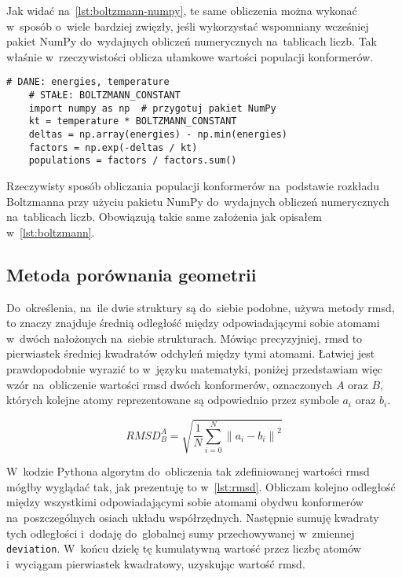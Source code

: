 Jak widać na~\cref{lst:boltzmann-numpy}, te same obliczenia można wykonać w~sposób o~wiele
  bardziej zwięzły, jeśli wykorzystać wspomniany wcześniej pakiet NumPy do~wydajnych obliczeń
  numerycznych na~tablicach liczb.
Tak właśnie \tesliper{} w~rzeczywistości oblicza ułamkowe wartości populacji konformerów.

\begin{listing}
  \begin{lstlisting}[emph={energies, temperature, BOLTZMANN_CONSTANT}]
    # DANE: energies, temperature
    # STAŁE: BOLTZMANN_CONSTANT
    import numpy as np  # przygotuj pakiet NumPy
    kt = temperature * BOLTZMANN_CONSTANT
    deltas = np.array(energies) - np.min(energies)
    factors = np.exp(-deltas / kt)
    populations = factors / factors.sum()
  \end{lstlisting}
  \caption{
    Rzeczywisty sposób obliczania populacji konformerów na~podstawie rozkładu Boltzmanna
      przy użyciu pakietu NumPy do~wydajnych obliczeń numerycznych na~tablicach liczb.
    Obowiązują takie same założenia jak opisałem w~\protect\cref{lst:boltzmann}.
  }\label{lst:boltzmann-numpy}
\end{listing}

\subsection{Metoda porównania geometrii}\label{implementation:rmsd}
Do~określenia, na~ile dwie struktury są do~siebie podobne, \tesliper{} używa metody \gls{rmsd},
  to znaczy znajduje średnią odległość między odpowiadającymi sobie atomami w~dwóch nałożonych
  na~siebie strukturach.
Mówiąc precyzyjniej, \gls{rmsd} to pierwiastek średniej kwadratów odchyleń między tymi atomami.
Łatwiej jest prawdopodobnie wyrazić to w~języku matematyki, poniżej przedstawiam więc wzór
  na~obliczenie wartości \gls{rmsd} dwóch konformerów, oznaczonych $A$ oraz $B$, których
  kolejne atomy reprezentowane są odpowiednio przez symbole $a_i$ oraz $b_i$.

\begin{equation}
  RMSD^A_B = \sqrt{\frac{1}{N}\sum\limits_{i=0}^N \left\| a_i-b_i \right\|^2}
\end{equation}

W~kodzie Pythona algorytm do~obliczenia tak zdefiniowanej wartości \gls{rmsd} mógłby wyglądać
  tak, jak prezentuję to w~\cref{lst:rmsd}.
Obliczam kolejno odległość między wszystkimi odpowiadającymi sobie atomami obydwu konformerów
  na~poszczególnych osiach układu współrzędnych.
Następnie sumuję kwadraty tych odległości i~dodaję do~globalnej sumy przechowywanej
  w~zmiennej \lstinline|deviation|.
W~końcu dzielę tę kumulatywną wartość przez liczbę atomów i~wyciągam pierwiastek kwadratowy,
  uzyskując wartość \gls{rmsd}.

